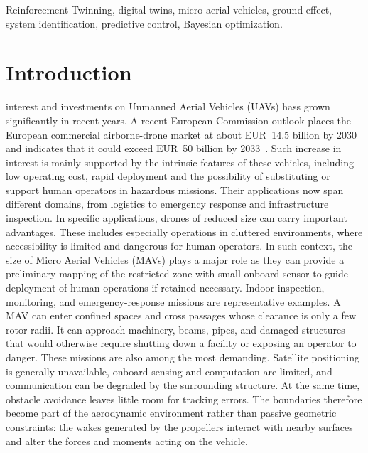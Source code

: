 \documentclass[journal]{IEEEtran}
\begin{document}
\begin{IEEEkeywords}Reinforcement Twinning, digital twins, micro aerial vehicles, ground effect, system identification, predictive control, Bayesian optimization.\end{IEEEkeywords}

\IEEEpeerreviewmaketitle

\section{Introduction}
\label{Introduction}
 interest and investments on Unmanned Aerial Vehicles (UAVs) hass grown significantly in recent years. A recent European Commission outlook places the European commercial airborne-drone market at about EUR~14.5 billion by 2030 and indicates that it could exceed EUR~50 billion by 2033~\cite{EuropeanCommission2026}. Such increase in interest is mainly supported by the intrinsic features of these vehicles, including low operating cost, rapid deployment and the possibility of substituting or support human operators in hazardous missions. Their applications now span different domains, from logistics to emergency response and infrastructure inspection. In specific applications, drones of reduced size can carry important advantages. These includes especially operations in cluttered environments, where accessibility is limited and dangerous for human operators. In such context, the size of Micro Aerial Vehicles (MAVs) plays a major role as they can provide a preliminary mapping of the restricted zone with small onboard sensor to guide deployment of human operations if retained necessary.   
Indoor inspection, monitoring, and emergency-response missions are representative examples. A MAV can enter confined spaces and cross passages whose clearance is only a few rotor radii. It can approach machinery, beams, pipes, and damaged structures that would otherwise require shutting down a facility or exposing an operator to danger. These missions are also among the most demanding. Satellite positioning is generally unavailable, onboard sensing and computation are limited, and communication can be degraded by the surrounding structure. At the same time, obstacle avoidance leaves little room for tracking errors. The boundaries therefore become part of the aerodynamic environment rather than passive geometric constraints: the wakes generated by the propellers interact with nearby surfaces and alter the forces and moments acting on the vehicle.
\end{document}
